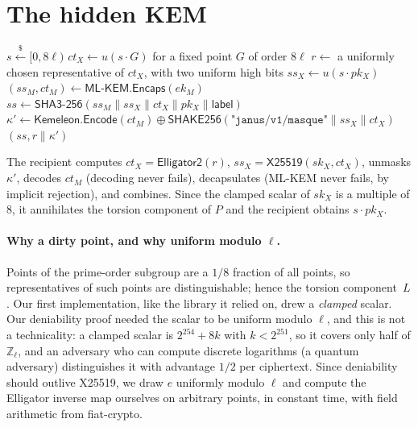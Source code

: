 \documentclass[11pt,a4paper]{article}
\theoremstyle{definition}
\theoremstyle{remark}
\newcommand{\SHAKE}{\mathsf{SHAKE256}}
\newcommand{\SHA}{\mathsf{SHA3\text{-}256}}
\newcommand{\Kem}{\mathsf{Kemeleon}}
\newcommand{\Ell}{\mathsf{Elligator2}}
\newcommand{\str}[1]{\texttt{"#1"}}
\newcommand{\getsr}{\xleftarrow{\$}}
\begin{document}
\section{The hidden KEM}
\label{sec:kem}

\begin{algorithm}[t]
\caption{Hidden X-Wing encapsulation to $pk = ek_M\|pk_X$.}
\label{alg:encaps}
\begin{algorithmic}[1]
\Repeat
  \State $s \getsr [0, 8\ell)$ \Comment{equivalently $e\getsr\mathbb{Z}_\ell$, $L\getsr T_8$, $P=e\cdot B+L$}
  \State $ct_X \gets u(s\cdot G)$ for a fixed point $G$ of order $8\ell$
\State $r \gets$ a uniformly chosen representative of $ct_X$, with two uniform high bits
\State $ss_X \gets u(s\cdot pk_X)$ 
\State $(ss_M, ct_M) \gets \mathsf{ML\text{-}KEM.Encaps}(ek_M)$
\State $ss \gets \SHA(ss_M\|ss_X\|ct_X\|pk_X\|\mathsf{label})$
\State $\kappa' \gets \Kem.\mathsf{Encode}(ct_M) \oplus \SHAKE(\str{janus/v1/masque}\|ss_X\|ct_X)$
\State \Return $(ss, r\|\kappa')$
\end{algorithmic}
\end{algorithm}

The recipient computes $ct_X = \Ell(r)$, $ss_X = \mathsf{X25519}(sk_X, ct_X)$, unmasks $\kappa'$, decodes $ct_M$ (decoding never fails), decapsulates (ML-KEM never fails, by implicit rejection), and combines. Since the clamped scalar of $sk_X$ is a multiple of 8, it annihilates the torsion component of $P$ and the recipient obtains $s\cdot pk_X$.

\paragraph{Why a dirty point, and why uniform modulo $\ell$.} Points of the prime-order subgroup are a $1/8$ fraction of all points, so representatives of such points are distinguishable; hence the torsion component~$L$. Our first implementation, like the library it relied on, drew a \emph{clamped} scalar. Our deniability proof needed the scalar to be uniform modulo $\ell$, and this is not a technicality: a clamped scalar is $2^{254}+8k$ with $k<2^{251}$, so it covers only half of $\mathbb{Z}_\ell$, and an adversary who can compute discrete logarithms (a quantum adversary) distinguishes it with advantage $1/2$ per ciphertext. Since deniability should outlive X25519, we draw $e$ uniformly modulo $\ell$ and compute the Elligator inverse map ourselves on arbitrary points, in constant time, with field arithmetic from fiat-crypto.
\end{document}
